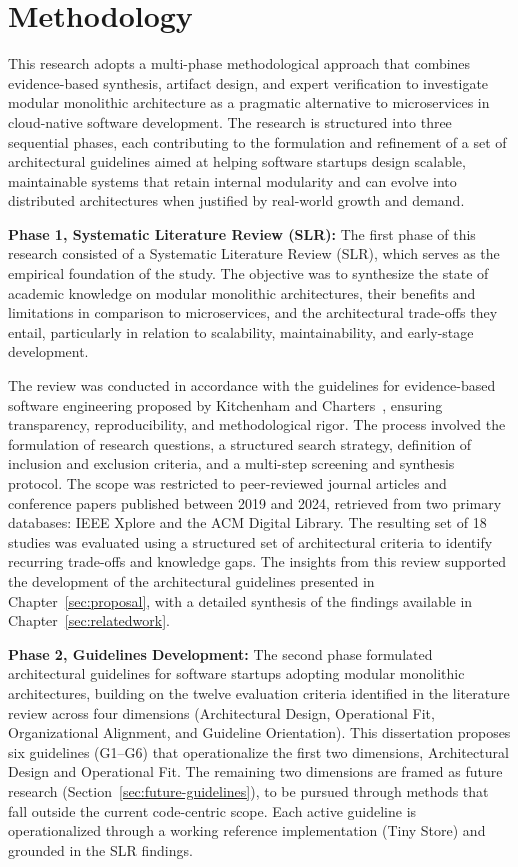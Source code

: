 \section{Methodology}

This research adopts a multi-phase methodological approach that combines evidence-based synthesis, artifact design, and expert verification to investigate modular monolithic architecture as a pragmatic alternative to microservices in cloud-native software development. The research is structured into three sequential phases, each contributing to the formulation and refinement of a set of architectural guidelines aimed at helping software startups design scalable, maintainable systems that retain internal modularity and can evolve into distributed architectures when justified by real-world growth and demand.

\textbf{Phase 1, Systematic Literature Review (SLR):}  
The first phase of this research consisted of a Systematic Literature Review (SLR), which serves as the empirical foundation of the study. The objective was to synthesize the state of academic knowledge on modular monolithic architectures, their benefits and limitations in comparison to microservices, and the architectural trade-offs they entail, particularly in relation to scalability, maintainability, and early-stage development.

The review was conducted in accordance with the guidelines for evidence-based software engineering proposed by Kitchenham and Charters~\cite{kitchenham2007guidelines}, ensuring transparency, reproducibility, and methodological rigor. The process involved the formulation of research questions, a structured search strategy, definition of inclusion and exclusion criteria, and a multi-step screening and synthesis protocol. The scope was restricted to peer-reviewed journal articles and conference papers published between 2019 and 2024, retrieved from two primary databases: IEEE Xplore and the ACM Digital Library. The resulting set of 18 studies was evaluated using a structured set of architectural criteria to identify recurring trade-offs and knowledge gaps. The insights from this review supported the development of the architectural guidelines presented in Chapter~\ref{sec:proposal}, with a detailed synthesis of the findings available in Chapter~\ref{sec:relatedwork}.

\textbf{Phase 2, Guidelines Development:}
The second phase formulated architectural guidelines for software startups adopting modular monolithic architectures, building on the twelve evaluation criteria identified in the literature review across four dimensions (Architectural Design, Operational Fit, Organizational Alignment, and Guideline Orientation). This dissertation proposes six guidelines (G1--G6) that operationalize the first two dimensions, Architectural Design and Operational Fit. The remaining two dimensions are framed as future research (Section~\ref{sec:future-guidelines}), to be pursued through methods that fall outside the current code-centric scope. Each active guideline is operationalized through a working reference implementation (Tiny Store) and grounded in the SLR findings.


